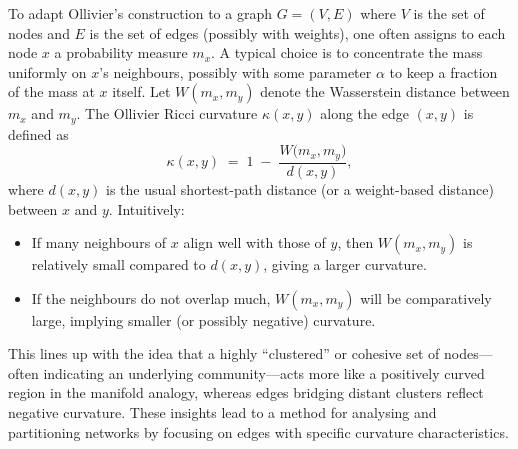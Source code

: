 To adapt Ollivier's construction to a graph $G = (V,E)$ where $V$ is the set of nodes and $E$ is the set of edges (possibly with weights), one often assigns to each node $x$ a probability measure $m_x$. A typical choice is to concentrate the mass uniformly on $x$’s neighbours, possibly with some parameter $\alpha$ to keep a fraction of the mass at $x$ itself. Let $W(m_x, m_y)$ denote the Wasserstein distance between $m_x$ and $m_y$. The Ollivier Ricci curvature $\kappa(x,y)$ along the edge $(x,y)$ is defined as 
\begin{equation}
\kappa(x,y) \;=\; 1 \;-\;\frac{W\bigl(m_x, m_y\bigr)}{d(x,y)},
\end{equation}
where $d(x,y)$ is the usual shortest-path distance (or a weight-based distance) between $x$ and $y$. Intuitively:
\begin{itemize}
    \item If many neighbours of $x$ align well with those of $y$, then $W(m_x,m_y)$ is relatively small compared to $d(x,y)$, giving a larger curvature.
    \item If the neighbours do not overlap much, $W(m_x,m_y)$ will be comparatively large, implying smaller (or possibly negative) curvature.
\end{itemize}
This lines up with the idea that a highly ``clustered'' or cohesive set of nodes—often indicating an underlying community—acts more like a positively curved region in the manifold analogy, whereas edges bridging distant clusters reflect negative curvature. These insights lead to a method for analysing and partitioning networks by focusing on edges with specific curvature characteristics.


